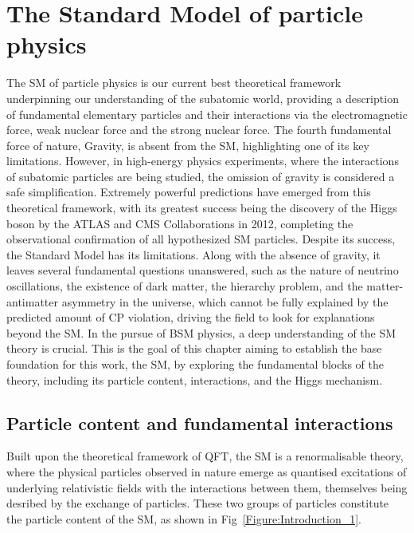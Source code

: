\chapter{The Standard Model of particle physics}
\thispagestyle{plain}  %
\pagestyle{chapterpages}
The \ac{SM} of particle physics is our current best theoretical framework underpinning our understanding of the subatomic world, providing a description of fundamental elementary particles and their interactions via the electromagnetic force, weak nuclear force and the strong nuclear force. The fourth fundamental force of nature, Gravity, is absent from the SM, highlighting one of its key limitations. However, in high-energy physics experiments, where the interactions of subatomic particles are being studied, the omission of gravity is considered a safe simplification. Extremely powerful predictions have emerged from this theoretical framework, with its greatest success being the discovery of the Higgs boson by the ATLAS and CMS Collaborations in 2012, completing the observational confirmation of all hypothesized SM particles. Despite its success, the Standard Model has its limitations. Along with the absence of gravity, it leaves several fundamental questions unanswered, such as the nature of neutrino oscillations, the existence of dark matter, the hierarchy problem, and the matter-antimatter asymmetry in the universe, which cannot be fully explained by the predicted amount of CP violation, driving the field to look for explanations beyond the SM. In the pursue of \ac{BSM} physics, a deep understanding of the SM theory is crucial. This is the goal of this chapter aiming to establish the base foundation for this work, the SM, by exploring the fundamental blocks of the theory, including its particle content, interactions, and the Higgs mechanism.

\section{Particle content and fundamental interactions}

Built upon the theoretical framework of \ac{QFT}, the SM is a renormalisable theory, where the physical particles observed in nature emerge as quantised excitations of underlying relativistic fields with the interactions between them, themselves being desribed by the exchange of particles. These two groups of particles constitute the particle content of the SM, as shown in Fig~\ref{Figure:Introduction_1}.

